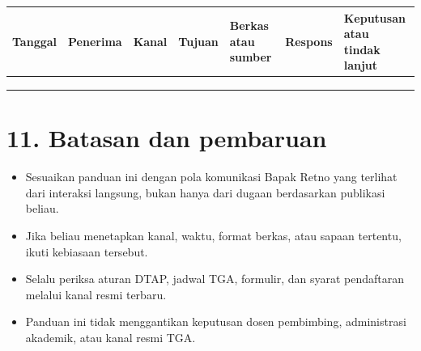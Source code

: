 \documentclass[
  indonesian,
]{article}
\newcounter{none} %
\providecommand{\tightlist}{%
  \setlength{\itemsep}{0pt}\setlength{\parskip}{0pt}}
\begin{document}
{\def\LTcaptype{none} %
\begin{longtable}[]{@{}
  >{\raggedright\arraybackslash}p{}
  >{\raggedright\arraybackslash}p{}
  >{\raggedright\arraybackslash}p{}
  >{\raggedright\arraybackslash}p{}
  >{\raggedright\arraybackslash}p{}
  >{\raggedright\arraybackslash}p{}
  >{\raggedright\arraybackslash}p{}@{}}
\toprule\noalign{}
\begin{minipage}[b]{\linewidth}\raggedright
Tanggal
\end{minipage} & \begin{minipage}[b]{\linewidth}\raggedright
Penerima
\end{minipage} & \begin{minipage}[b]{\linewidth}\raggedright
Kanal
\end{minipage} & \begin{minipage}[b]{\linewidth}\raggedright
Tujuan
\end{minipage} & \begin{minipage}[b]{\linewidth}\raggedright
Berkas atau sumber
\end{minipage} & \begin{minipage}[b]{\linewidth}\raggedright
Respons
\end{minipage} & \begin{minipage}[b]{\linewidth}\raggedright
Keputusan atau tindak lanjut
\end{minipage} \\
\midrule\noalign{}
\endhead
\bottomrule\noalign{}
\endlastfoot
& & & & & & \\
& & & & & & \\
& & & & & & \\
\end{longtable}
}

\section{11. Batasan dan pembaruan}\label{batasan-dan-pembaruan}

\begin{itemize}
\tightlist
\item
  Sesuaikan panduan ini dengan pola komunikasi Bapak Retno yang terlihat
  dari interaksi langsung, bukan hanya dari dugaan berdasarkan publikasi
  beliau.
\item
  Jika beliau menetapkan kanal, waktu, format berkas, atau sapaan
  tertentu, ikuti kebiasaan tersebut.
\item
  Selalu periksa aturan DTAP, jadwal TGA, formulir, dan syarat
  pendaftaran melalui kanal resmi terbaru.
\item
  Panduan ini tidak menggantikan keputusan dosen pembimbing,
  administrasi akademik, atau kanal resmi TGA.
\end{itemize}
\end{document}
